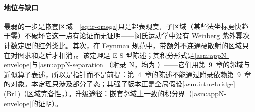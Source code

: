 \paragraph{地位与缺口}
最弱的一步是嵌套区域：\cref{eq:ir-omega}只是超表观度，子区域（某些法坐标更快趋于零）不破坏它这一点有论证而无证明——闵氏运动学中没有 Weinberg 紫外幂次计数定理\cite{Weinberg1960,Hahn:1968HZ}的红外类比。其次，在 Feynman 规范中，带额外不连通硬散射的区域只在对图求和之后才相消\cite{Labastida:1984gy}，\cite[第~14.4.8~节]{Collins2011}。该定理是 E-S 型陈述；其积分形式是\cref{asm:appN-envelope}与\cref{asm:appN-separation}（附录~N，均为 \tagA）——它们用第~9~章的邻域与近似算子表述，所以是指针而不是前提：第~4~章的陈述不能通过附录依赖第~9~章的对象。本定理只涉及部分子态；其强子版本正是全局假设\cref{asm:intro-bridge}(Br1)（区域完备性，\tagC）。升级途径：嵌套邻域上一致的积分界（\cref{asm:appN-envelope}的证明）。

